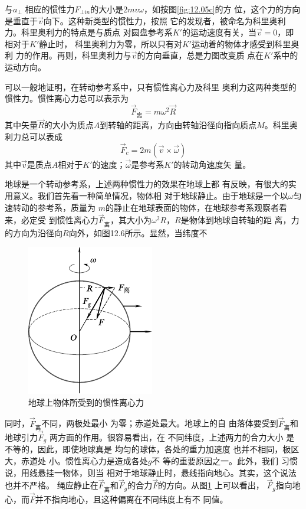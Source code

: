 与$ a _ { \bot } $ 相应的惯性力$ F_{\bot in} $的大小是$ 2mv\omega $，如按图\ref{fig:12.05c}的方
位，这个力的方向是垂直于$\vec{v}$向下。这种新类型的惯性力，按照
它的发现者，被命名为科里奥利力。科里奥利力的特点是与质点
对圆盘参考系$ K' $的运动速度有关，当$ \vec{v} = 0 $，即相对于$ K' $静止时，
科里奥利力为零，所以只有对$ K' $运动着的物体才感受到科里奥利
力的作用。再则，科里奥利力与$\vec{v}$的方向垂直，总是力图改变质
点在$ K' $系中的运动方向。

可以一般地证明，在转动参考系中，只有惯性离心力及科里
奥利力这两种类型的惯性力。惯性离心力总可以表示为
\begin{equation}\label{eqn:12.02.06}
  \vec{F} _ \text{离} = m \omega ^ { 2 } \vec{R}
\end{equation}
其中矢量$\vec{R}$的大小为质点$ A $到转轴的距离，方向由转轴沿径向指向质点$ M $。科里奥利力总可以表成
\begin{equation}\label{eqn:12.02.07}
  \vec{F} _ { c } = 2 m \left( \vec{v} \times \vec{\omega} \right)
\end{equation}
其中$\vec{v}$是质点$ A $相对于$ K' $的速度；$\vec{\omega}$是参考系$ K' $的转动角速度矢
量。

地球是一个转动参考系，上述两种惯性力的效果在地球上都
有反映，有很大的实用意义。我们首先看一种简单情况，物体相
对于地球静止。由于地球是一个以$ \omega $匀速转动的参考系，质量为
$ m $的静止在地球表面的物体，在地球参考系观察者看来，必定受
到惯性离心力$ \vec{F}_\text{离} $，其大小为$ \omega ^ { 2 } R $，$ R $是物体到地球自转轴的距
离，力的方向为沿径向$ R $向外，如图12.6所示。显然，当纬度不
\begin{figure}
  \centering
  \includegraphics{figure/fig12.06}
  \caption{地球上物体所受到的惯性离心力}
  \label{fig:12.06}
\end{figure}
同时，$ \vec{F}_\text{离} $不同，两极处最小
为零；赤道处最大。地球上的自
由落体要受到$ \vec{F}_\text{离} $和地球引力$ \vec{F}_g $
两方面的作用。很容易看出，在
不同纬度，上述两力的合力大小
是不等的，因此，即使地球真是
均匀的球体，各处的重力加速度
也并不相同，极区大，赤道处
小。惯性离心力是造成各处$ g $不
等的重要原因之一。此外，我们
习惯说，用线悬挂一物体，则当
相对于地球静止时，悬线指向地心。其实，这个说法也并不严格。
绳应静止在$ \vec{F}_\text{离} $和$ \vec{F}_g $的合力$ \vec{F} $的方向。从图\ref{fig:12.06} 上可以看出，
$ \vec{F}_g $指向地心，而$ \vec{F} $并不指向地心，且这种偏离在不同纬度上有不
同值。

